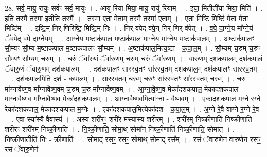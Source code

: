 \documentclass[17pt]{extarticle}
\begin{document}
28. सर्व॒ मायु॒ रायुः॒ सर्वꣳ॒॒ सर्व॒ मायुः॑ । . आयु॑ रिया मिया॒ मायु॒ रायु॑ रियाम् । . इ॒या॒ मितीती॑या मिया॒ मिति॑ । . इति॒ तस्मै॒ तस्मा॒ इतीति॒ तस्मै᳚ । . तस्मा॑ ए॒ता मे॒ताम् तस्मै॒ तस्मा॑ ए॒ताम् । . ए॒ता मिष्टि॒ मिष्टि॑ मे॒ता मे॒ता मिष्टि᳚म् । . इष्टि॒म् निर् णिरिष्टि॒ मिष्टि॒म् निः । . निर् व॑पेद् वपे॒न् निर् णिर् व॑पेत् । . व॒पे॒ दा॒ग्ने॒य मा᳚ग्ने॒यं ॅव॑पेद् वपे दाग्ने॒यम् । . आ॒ग्ने॒य म॒ष्टाक॑पाल म॒ष्टाक॑पाल माग्ने॒य मा᳚ग्ने॒य म॒ष्टाक॑पालम् । . अ॒ष्टाक॑पालꣳ सौ॒म्यꣳ सौ॒म्य म॒ष्टाक॑पाल म॒ष्टाक॑पालꣳ सौ॒म्यम् । . अ॒ष्टाक॑पाल॒मित्य॒ष्टा - क॒पा॒ल॒म् । . सौ॒म्यम् च॒रुम् च॒रुꣳ सौ॒म्यꣳ सौ॒म्यम् च॒रुम् । . च॒रुं ॅवा॑रु॒णं ॅवा॑रु॒णम् च॒रुम् च॒रुं ॅवा॑रु॒णम् । . वा॒रु॒णम् दश॑कपाल॒म् दश॑कपालं ॅवारु॒णं ॅवा॑रु॒णम् दश॑कपालम् । . दश॑कपालꣳ सारस्व॒तꣳ सा॑रस्व॒तम् दश॑कपाल॒म् दश॑कपालꣳ सारस्व॒तम् । . दश॑कपाल॒मिति॒ दश॑ - क॒पा॒ल॒म् । . सा॒र॒स्व॒तम् च॒रुम् च॒रुꣳ सा॑रस्व॒तꣳ सा॑रस्व॒तम् च॒रुम् । . च॒रु मा᳚ग्नावैष्ण॒व मा᳚ग्नावैष्ण॒वम् च॒रुम् च॒रु मा᳚ग्नावैष्ण॒वम् । . आ॒ग्ना॒वै॒ष्ण॒व मेका॑दशकपाल॒ मेका॑दशकपाल माग्नावैष्ण॒व मा᳚ग्नावैष्ण॒व मेका॑दशकपालम् । . आ॒ग्ना॒वै॒ष्ण॒वमित्या᳚ग्ना - वै॒ष्ण॒वम् । . एका॑दशकपाल म॒ग्ने र॒ग्ने रेका॑दशकपाल॒ मेका॑दशकपाल म॒ग्नेः । . एका॑दशकपाल॒मित्येका॑दश - क॒पा॒ल॒म् । . अ॒ग्ने रे॒वै वाग्ने र॒ग्ने रे॒व । . ए॒वा स्या᳚स्यै॒ वैवास्य॑ । . अ॒स्य॒ शरी॑रꣳ॒॒ शरी॑र मस्यास्य॒ शरी॑रम् । . शरी॑रम् निष्क्री॒णाति॑ निष्क्री॒णाति॒ शरी॑रꣳ॒॒ शरी॑रम् निष्क्री॒णाति॑ । . नि॒ष्क्री॒णाति॒ सोमा॒थ् सोमा᳚न् निष्क्री॒णाति॑ निष्क्री॒णाति॒ सोमा᳚त् । . नि॒ष्क्री॒णातीति॑ निः - क्री॒णाति॑ । . सोमा॒द् रसꣳ॒॒ रसꣳ॒॒ सोमा॒थ् सोमा॒द् रस᳚म् । . रसं॑ ॅवारु॒णेन॑ वारु॒णेन॒ रसꣳ॒॒ रसं॑ ॅवारु॒णेन॑ । \newline
\end{document}
